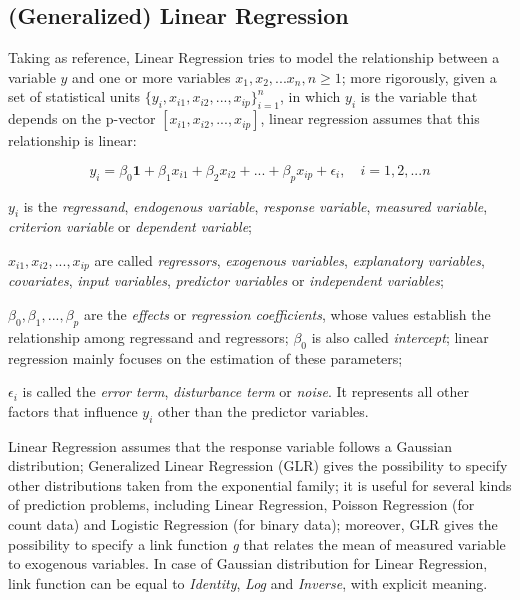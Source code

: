 \subsection{(Generalized) Linear Regression}\label{glr}

Taking \cite{site:caltechML2012} as reference, Linear Regression tries to model the relationship between a variable $y$ and one or more variables $x_1, x_2, ... x_n, n \ge 1$; more rigorously, given a set of statistical units $\{y_i, x_{i1}, x_{i2}, ..., x_{ip}\}_{i = 1}^n$, in which $y_i$ is the variable that depends on the p-vector $[x_{i1}, x_{i2}, ..., x_{ip}]$, linear regression assumes that this relationship is linear:

\begin{equation}
    y_i = \beta_0\boldsymbol{1} + \beta_1x_{i1} + \beta_2x_{i2} + ... +  \beta_px_{ip} + \epsilon_i, \quad i = 1, 2, ... n
\end{equation}

$y_i$ is the \textit{regressand}, \textit{endogenous variable}, \textit{response variable}, \textit{measured variable}, \textit{criterion variable} or \textit{dependent variable};

$x_{i1}, x_{i2}, ..., x_{ip}$ are called \textit{regressors}, \textit{exogenous variables}, \textit{explanatory variables}, \textit{covariates}, \textit{input variables}, \textit{predictor variables} or \textit{independent variables};

$\beta_0, \beta_1, ..., \beta_p$ are the \textit{effects} or \textit{regression coefficients}, whose values establish the relationship among regressand and regressors; $\beta_0$ is also called \textit{intercept}; linear regression mainly focuses on the estimation of these parameters;

$\epsilon_i$ is called the \textit{error term}, \textit{disturbance term} or \textit{noise}. It represents all other factors that influence $y_i$ other than the predictor variables.

Linear Regression assumes that the response variable follows a Gaussian distribution; Generalized Linear Regression (GLR) gives the possibility to specify other distributions taken from the exponential family; it is useful for several kinds of prediction problems, including Linear Regression, Poisson Regression (for count data) and Logistic Regression (for binary data); moreover, GLR gives the possibility to specify a link function \textit{g} that relates the mean of measured variable to exogenous variables. In case of Gaussian distribution for Linear Regression, link function can be equal to \textit{Identity}, \textit{Log} and \textit{Inverse}, with explicit meaning.


